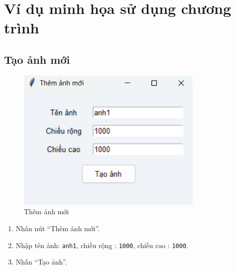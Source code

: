\documentclass[a4paper,12pt]{article}
\begin{document}
\section{Ví dụ minh họa sử dụng chương trình}

\subsection{Tạo ảnh mới}
\begin{figure}[H]
    \centering
    \includegraphics[width=0.8\textwidth]{addPic.png}
    \caption{Thêm ảnh mới}
    \label{fig:tlm_tab}
    \end{figure}
\begin{enumerate}
    \item Nhấn nút “Thêm ảnh mới”.
    \item Nhập tên ảnh: \texttt{anh1}, chiều rộng : \texttt{1000}, chiều cao : \texttt{1000}.
    \item Nhấn “Tạo ảnh”.
\end{enumerate}
\end{document}
